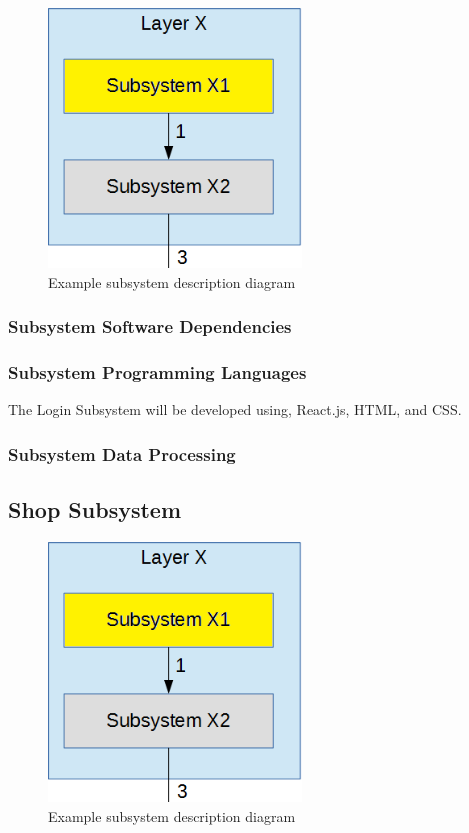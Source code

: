 \begin{figure}[h!]
	\centering
 	\includegraphics[width=0.60\textwidth]{images/subsystem}
 \caption{Example subsystem description diagram}
\end{figure}

\subsubsection{Subsystem Software Dependencies}

\subsubsection{Subsystem Programming Languages}
The Login Subsystem will be developed using, React.js, HTML, and CSS.

\subsubsection{Subsystem Data Processing}

\subsection{Shop Subsystem}

\begin{figure}[h!]
	\centering
 	\includegraphics[width=0.60\textwidth]{images/subsystem}
 \caption{Example subsystem description diagram}
\end{figure}

